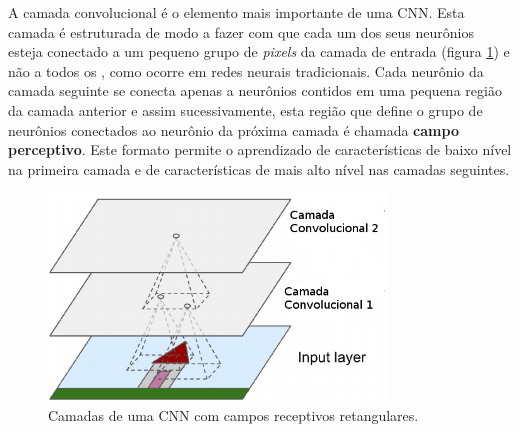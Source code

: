 A camada convolucional é o elemento mais importante de uma CNN. Esta camada é estruturada
de modo a fazer com que cada um dos seus neurônios esteja conectado a um 
pequeno grupo de \textit{pixels} da camada de entrada (figura \ref{fig:cnn_arq}) e não a todos os , como
ocorre em redes neurais tradicionais. Cada neurônio da camada seguinte se conecta apenas a neurônios
contidos em uma pequena região da camada anterior e assim sucessivamente, esta região que define
o grupo de neurônios conectados ao neurônio da próxima camada é chamada \textbf{campo perceptivo}.
Este formato permite o aprendizado de características de baixo nível na primeira camada e de
características de mais alto nível nas camadas seguintes.
\begin{figure}[htp]
\begin{center}
  \includegraphics[width=0.8\textwidth]{fig/cnn_arq}
  \caption{Camadas de uma CNN com campos receptivos retangulares.}
  \label{fig:cnn_arq}
\end{center}
\end{figure}

